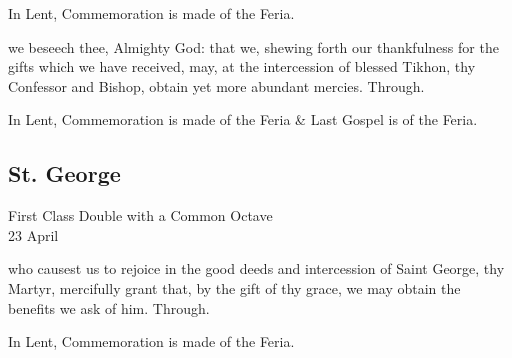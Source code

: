 \begin{rubric}
    In Lent, Commemoration is made of the Feria.%
\end{rubric}

\postcommunion
{} we beseech thee, Almighty God: that we, shewing forth our thankfulness for the gifts which we have received, may, at the intercession of blessed Tikhon, thy Confessor and Bishop, obtain yet more abundant mercies. Through.

\begin{rubric}
    In Lent, Commemoration is made of the Feria \& Last Gospel is of the Feria.
\end{rubric}


\clearpage
\subsection{St. George}
\begin{inhead}
    {First Class Double with a Common Octave\\
23 April}
\end{inhead}


\introit

\collect
{} who causest us to rejoice in the good deeds and intercession of Saint George, thy Martyr, mercifully grant that, by the gift of thy grace, we may obtain the benefits we ask of him. Through.
\begin{rubric}
    In Lent, Commemoration is made of the Feria.%
\end{rubric}

